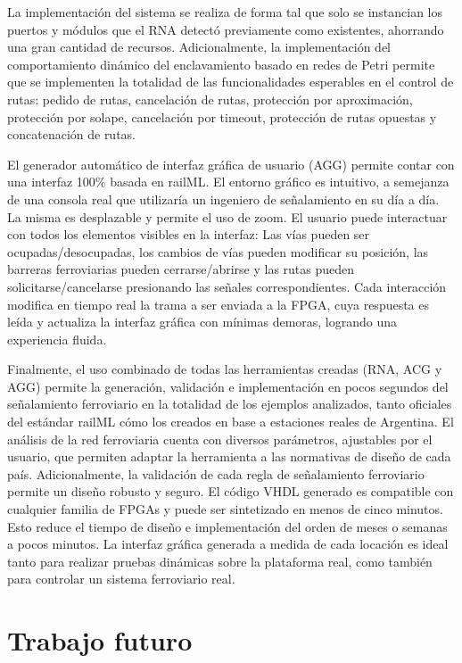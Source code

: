 La implementación del sistema se realiza de forma tal que solo se instancian los puertos y módulos que el RNA detectó previamente como existentes, ahorrando una gran cantidad de recursos. Adicionalmente, la implementación del comportamiento dinámico del enclavamiento basado en redes de Petri permite que se implementen la totalidad de las funcionalidades esperables en el control de rutas: pedido de rutas, cancelación de rutas, protección por aproximación, protección por solape, cancelación por timeout, protección de rutas opuestas y concatenación de rutas.

El generador automático de interfaz gráfica de usuario (AGG) permite contar con una interfaz 100\% basada en railML. El entorno gráfico es intuitivo, a semejanza de una consola real que utilizaría un ingeniero de señalamiento en su día a día. La misma es desplazable y permite el uso de zoom. El usuario puede interactuar con todos los elementos visibles en la interfaz: Las vías pueden ser ocupadas/desocupadas, los cambios de vías pueden modificar su posición, las barreras ferroviarias pueden cerrarse/abrirse y las rutas pueden solicitarse/cancelarse presionando las señales correspondientes. Cada interacción modifica en tiempo real la trama a ser enviada a la FPGA, cuya respuesta es leída y actualiza la interfaz gráfica con mínimas demoras, logrando una experiencia fluida.

Finalmente, el uso combinado de todas las herramientas creadas (RNA, ACG y AGG) permite la generación, validación e implementación en pocos segundos del señalamiento ferroviario en la totalidad de los ejemplos analizados, tanto oficiales del estándar railML cómo los creados en base a estaciones reales de Argentina. El análisis de la red ferroviaria cuenta con diversos parámetros, ajustables por el usuario, que permiten adaptar la herramienta a las normativas de diseño de cada país. Adicionalmente, la validación de cada regla de señalamiento ferroviario permite un diseño robusto y seguro. El código VHDL generado es compatible con cualquier familia de FPGAs y puede ser sintetizado en menos de cinco minutos. Esto reduce el tiempo de diseño e implementación del orden de meses o semanas a pocos minutos. La interfaz gráfica generada a medida de cada locación es ideal tanto para realizar pruebas dinámicas sobre la plataforma real, como también para controlar un sistema ferroviario real.

\section{Trabajo futuro}

